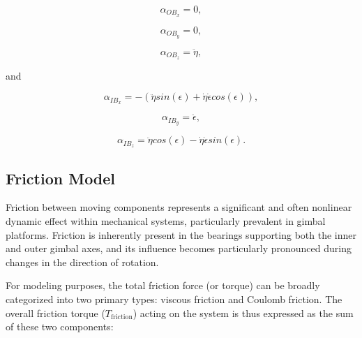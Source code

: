 \begin{equation}
   \alpha_{OB_x} = 0,
\end{equation}

\begin{equation}
   \alpha_{OB_y} = 0,
\end{equation}

\begin{equation}
   \alpha_{OB_z} = \ddot \eta,
\end{equation}

and

\begin{equation}
   \alpha_{IB_x} = - (\ddot \eta sin(\epsilon) + \dot \eta \dot \epsilon cos(\epsilon)),
\end{equation}

\begin{equation}
   \alpha_{IB_y} = \ddot \epsilon,
\end{equation}

\begin{equation}
   \label{alphaelevacao}
   \alpha_{IB_z} = \ddot \eta cos(\epsilon) - \dot \eta \dot \epsilon sin(\epsilon).
\end{equation}

\subsection{Friction Model}
Friction between moving components represents a significant and often nonlinear dynamic effect within mechanical systems, particularly prevalent in gimbal platforms. Friction is inherently present in the bearings supporting both the inner and outer gimbal axes, and its influence becomes particularly pronounced during changes in the direction of rotation.

For modeling purposes, the total friction force (or torque) can be broadly categorized into two primary types: viscous friction and Coulomb friction. The overall friction torque ($T_{\text{friction}}$) acting on the system is thus expressed as the sum of these two components:

